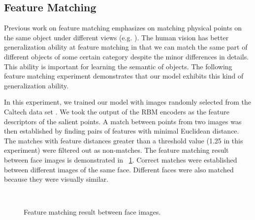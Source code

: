 \documentclass[conference]{IEEEtran}
\begin{document}
\subsection{Feature Matching}

Previous work on feature matching emphasizes on matching 
physical points on the same object under different views (e.g. \cite{brown2011}).
The human vision has better generalization ability at feature matching
in that we can match the same part of different objects of some certain category
despite the minor differences in details.
This ability is important for learning the semantic of objects.
The following feature matching experiment demonstrates
that our model exhibits this kind of generalization ability.

In this experiment, we trained our model 
with images randomly selected from the Caltech data set \cite{fei2007}.
We took the output of the RBM encoders as the feature descriptors of the salient points.
A match between points from two images was then established by finding pairs of features
with minimal Euclidean distance.
The matches with feature distances greater than a threshold value (1.25 in this experiment)
were filtered out as non-matches.
The feature matching result between face images is demonstrated in \figurename~\ref{fig:12}.
Correct matches were established between different images of the same face.
Different faces were also matched because they were visually similar.

\begin{figure}[htp]
\centering
{}\\
\caption{Feature matching result between face images.}
\label{fig:12}
\end{figure}
\end{document}
